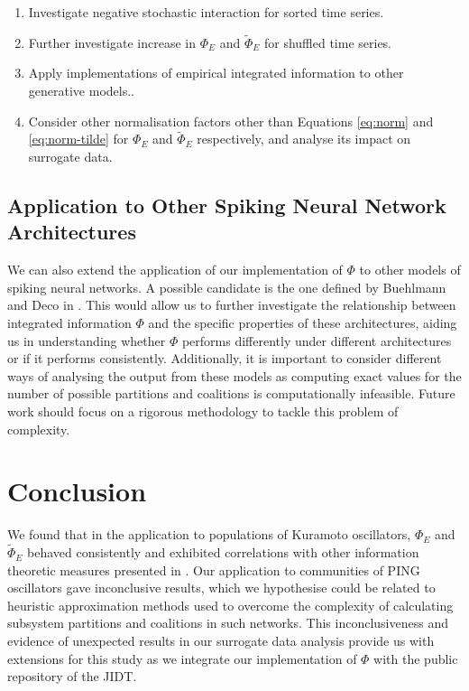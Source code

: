 \documentclass[a4paper,11pt]{article}
\begin{document}
\begin{enumerate}
\item{Investigate negative stochastic interaction for sorted time series.}
\item{Further investigate increase in $\Phi_E$ and $\widetilde{\Phi}_E$ for shuffled time series.}
\item{Apply implementations of empirical integrated information to other generative models.}.
\item{Consider other normalisation factors other than Equations \ref{eq:norm} and \ref{eq:norm-tilde} for $\Phi_E$ and $\widetilde{\Phi}_E$ respectively, and analyse its impact on surrogate data.}
\end{enumerate}

\subsection{Application to Other Spiking Neural Network Architectures}
\label{sec:fw:snn}
We can also extend the application of our implementation of $\Phi$ to other models of spiking neural networks. A possible candidate is the one defined by Buehlmann and Deco in \cite{Buehlmann2010}. This would allow us to further investigate the relationship between integrated information $\Phi$ and the specific properties of these architectures, aiding us in understanding whether $\Phi$ performs differently under different architectures or if it performs consistently. Additionally, it is important to consider different ways of analysing the output from these models as computing exact values for the number of possible partitions and coalitions is computationally infeasible. Future work should focus on a rigorous methodology to tackle this problem of complexity.

\clearpage

\section{Conclusion}
\label{sec:conclusion}

We found that in the application to populations of Kuramoto oscillators, $\Phi_E$ and $\widetilde{\Phi}_E$ behaved consistently and exhibited correlations with other information theoretic measures presented in \cite{Shanahan2010}. Our application to communities of PING oscillators gave inconclusive results, which we hypothesise could be related to heuristic approximation methods used to overcome the complexity of calculating subsystem partitions and coalitions in such networks. This inconclusiveness and evidence of unexpected results in our surrogate data analysis provide us with extensions for this study as we integrate our implementation of $\Phi$ with the public repository of the JIDT. 

\clearpage


{}
\clearpage
\end{document}
